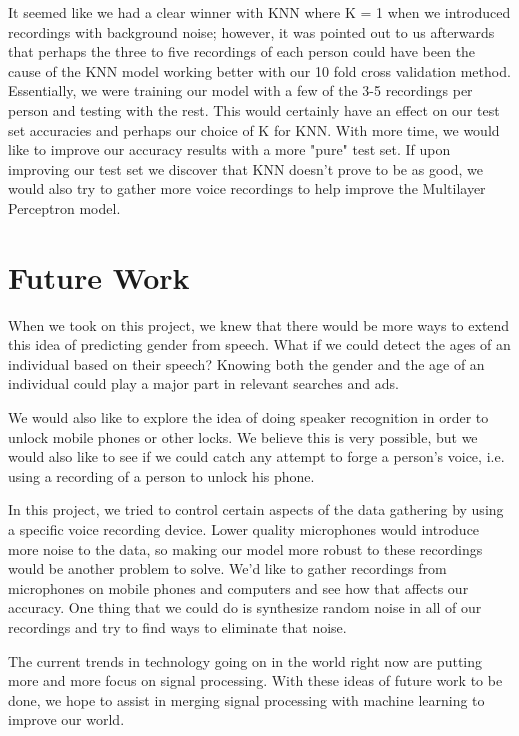 \documentclass{article}
\begin{document}
It seemed like we had a clear winner with KNN where K = 1 when we introduced recordings with background noise; however, it was pointed out to us afterwards that perhaps the three to five recordings of each person could have been the cause of the KNN model working better with our 10 fold cross validation method. Essentially, we were training our model with a few of the 3-5 recordings per person and testing with the rest. This would certainly have an effect on our test set accuracies and perhaps our choice of K for KNN. With more time, we would like to improve our accuracy results with a more "pure" test set. If upon improving our test set we discover that KNN doesn't prove to be as good, we would also try to gather more voice recordings to help improve the Multilayer Perceptron model.

\section{Future Work}

When we took on this project, we knew that there would be more ways to extend this idea of predicting gender from speech. What if we could detect the ages of an individual based on their speech? Knowing both the gender and the age of an individual could play a major part in relevant searches and ads.

We would also like to explore the idea of doing speaker recognition in order to unlock mobile phones or other locks. We believe this is very possible, but we would also like to see if we could catch any attempt to forge a person's voice, i.e. using a recording of a person to unlock his phone.

In this project, we tried to control certain aspects of the data gathering by using a specific voice recording device. Lower quality microphones would introduce more noise to the data, so making our model more robust to these recordings would be another problem to solve. We'd like to gather recordings from microphones on mobile phones and computers and see how that affects our accuracy. One thing that we could do is synthesize random noise in all of our recordings and try to find ways to eliminate that noise.

The current trends in technology going on in the world right now are putting more and more focus on signal processing. With these ideas of future work to be done, we hope to assist in merging signal processing with machine learning to improve our world.

\appendix


\nocite{*}


\end{document}
